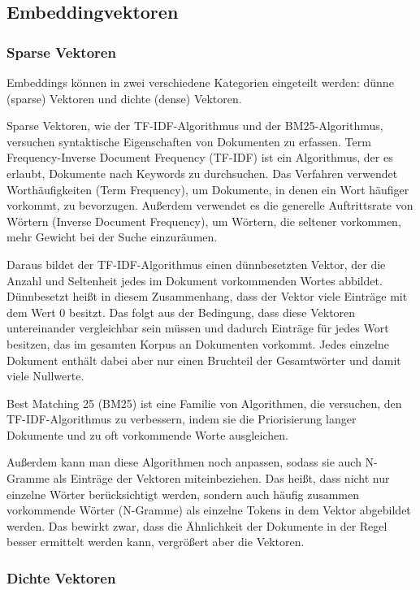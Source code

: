 \subsection{Embeddingvektoren}

\subsubsection{Sparse Vektoren}

Embeddings können in zwei verschiedene Kategorien eingeteilt werden: dünne (sparse) Vektoren und dichte (dense) Vektoren.

Sparse Vektoren, wie der TF-IDF-Algorithmus und der BM25-Algorithmus, versuchen syntaktische Eigenschaften von Dokumenten zu erfassen.
Term Frequency-Inverse Document Frequency (TF-IDF) ist ein Algorithmus, der es erlaubt, Dokumente nach Keywords zu durchsuchen.
Das Verfahren verwendet Worthäufigkeiten (Term Frequency), um Dokumente, in denen ein Wort häufiger vorkommt, zu bevorzugen.
Außerdem verwendet es die generelle Auftrittsrate von Wörtern (Inverse Document Frequency), um Wörtern, die seltener vorkommen, mehr Gewicht bei der Suche einzuräumen.

Daraus bildet der TF-IDF-Algorithmus einen dünnbesetzten Vektor, der die Anzahl und Seltenheit jedes im Dokument vorkommenden Wortes abbildet.
Dünnbesetzt heißt in diesem Zusammenhang, dass der Vektor viele Einträge mit dem Wert 0 besitzt.
Das folgt aus der Bedingung, dass diese Vektoren untereinander vergleichbar sein müssen und dadurch Einträge für jedes Wort besitzen, das im gesamten Korpus an Dokumenten vorkommt.
Jedes einzelne Dokument enthält dabei aber nur einen Bruchteil der Gesamtwörter und damit viele Nullwerte.

Best Matching 25 (BM25) ist eine Familie von Algorithmen, die versuchen, den TF-IDF-Algorithmus zu verbessern, indem sie die Priorisierung langer Dokumente und zu oft vorkommende Worte ausgleichen.

Außerdem kann man diese Algorithmen noch anpassen, sodass sie auch N-Gramme als Einträge der Vektoren miteinbeziehen.
Das heißt, dass nicht nur einzelne Wörter berücksichtigt werden, sondern auch häufig zusammen vorkommende Wörter (N-Gramme) als einzelne Tokens in dem Vektor abgebildet werden.
Das bewirkt zwar, dass die Ähnlichkeit der Dokumente in der Regel besser ermittelt werden kann, vergrößert aber die Vektoren.

\subsubsection{Dichte Vektoren}

